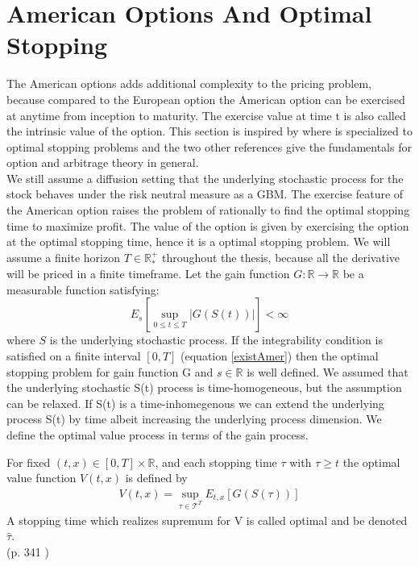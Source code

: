 
\section{American Options And Optimal Stopping}\label{AmericanOptions}
The American options adds additional complexity to the pricing problem, because compared to the European option the American option can be exercised at anytime from inception to maturity. The exercise value at time t is also called the intrinsic value of the option. This section is inspired by \parencite{finKont, Shiryaev06,Elliott99} where \parencite{Shiryaev06} is specialized to optimal stopping problems and the two other references give the fundamentals for option and arbitrage theory in general.\\

We still assume a diffusion setting that the underlying stochastic process for the stock behaves under the risk neutral measure as a GBM. The exercise feature of the American option raises the problem of rationally to find the optimal stopping time to maximize profit. The value of the option is given by exercising the option at the optimal stopping time, hence it is a optimal stopping problem. We will assume a finite horizon $T\in \mathbb{R}_*^+$ throughout the thesis, because all the derivative will be priced in a finite timeframe. Let the gain function $G:\mathbb{R}\to \mathbb{R}$ be a measurable function satisfying:
\begin{equation}\label{existAmer}
E_{s}[\sup_{0\leq t \leq T}|G(S(t))|] < \infty
\end{equation}
where $S$ is the underlying stochastic process. If the integrability condition is satisfied on a finite interval $[0,T]$ (equation \eqref{existAmer}) then the optimal stopping problem for gain function G and $s \in \mathbb{R}$ is well defined. We assumed that the underlying stochastic S(t) process is time-homogeneous, but the assumption can be relaxed. If S(t) is a time-inhomegenous we can extend the underlying process S(t) by time albeit increasing the underlying process dimension. We define the optimal value process in terms of the gain process.

\theoremstyle{definition}
\begin{definition}{}\label{optValFunc}
For fixed $(t,x)\in [0,T] \times \mathbb{R}$, and each stopping time $\tau$ with $\tau\geq t$ the optimal value function $V(t,x)$ is defined by
\begin{align}
V(t,x)= \sup_{\tau \in \mathcal{T}^T} E_{t,x}[G(S(\tau))]
\end{align}
A stopping time which realizes supremum for V is called optimal and be denoted $\hat{\tau}$.
\\ \null \hfill (p. 341 \parencite{finKont})
\end{definition}


